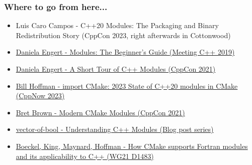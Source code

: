 \documentclass[aspectratio=169]{beamer}
\begin{document}
\begin{frame}
  \frametitle{Where to go from here...}

  \begin{itemize}
    \item Luis Caro Campos - C++20 Modules: The Packaging and Binary Redistribution Story (CppCon 2023, right afterwards in Cottonwood)
    \vspace{1em}
    \item \href{https://www.youtube.com/watch?v=Kqo-jIq4V3I}{Daniela Engert - Modules: The Beginner's Guide (Meeting C++ 2019)}
    \item \href{https://www.youtube.com/watch?v=nP8QcvPpGeM}{Daniela Engert - A Short Tour of C++ Modules (CppCon 2021)}
    \item \href{https://www.youtube.com/watch?v=c563KgO-uf4}{Bill Hoffman - import CMake: 2023 State of C++20 modules in CMake (CppNow 2023)}
    \item \href{https://www.youtube.com/watch?v=IZXNsim9TWI}{Bret Brown - Modern CMake Modules (CppCon 2021)}
    \item \href{https://vector-of-bool.github.io/2019/03/10/modules-1.html}{vector-of-bool - Understanding C++ Modules (Blog post series)}
    \item \href{https://mathstuf.fedorapeople.org/fortran-modules/fortran-modules.html}{Boeckel, King, Maynard, Hoffman - How CMake supports Fortran modules and its applicability to C++ (WG21 D1483)}
  \end{itemize}
\end{frame}

\end{document}
